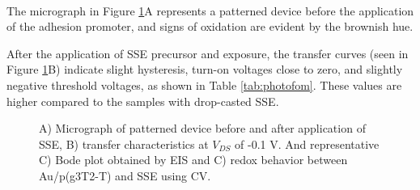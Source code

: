 \\

The micrograph in Figure \ref{fig:photoSSE}A represents a patterned device before the application of the adhesion promoter, and signs of oxidation are evident by the brownish hue. 

After the application of SSE precursor and exposure, the transfer curves (seen in Figure \ref{fig:photoSSE}B) indicate slight hysteresis, turn-on voltages close to zero, and slightly negative threshold voltages, as shown in Table \ref{tab:photofom}. These values are higher compared to the samples with drop-casted SSE. 

\begin{figure}[ht]
    \centering
    \hspace{2em}
    \qquad
    \caption[Performance of solid-OECT with photolithographed SSE]{A) Micrograph of patterned device before and after application of SSE, B) transfer characteristics at $V_{DS}$ of -0.1 V. And representative C) Bode plot obtained by EIS and C) redox behavior between Au/p(g3T2-T) and SSE using CV.}
    \label{fig:photoSSE}
\end{figure}

